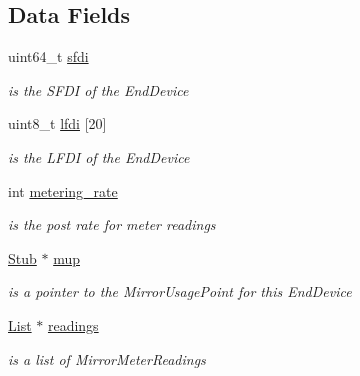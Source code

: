 \subsection*{Data Fields}
\begin{DoxyCompactItemize}
\item 
\mbox{\label{structDerDevice_a2a3131b81ae00c7ef1f48f67b5427db2}} 
uint64\+\_\+t \hyperlink{structDerDevice_a2a3131b81ae00c7ef1f48f67b5427db2}{sfdi}
\begin{DoxyCompactList}\small\item\em is the S\+F\+DI of the End\+Device \end{DoxyCompactList}\item 
\mbox{\label{structDerDevice_ad4c29cf0613088f60ab253e7a818efb5}} 
uint8\+\_\+t \hyperlink{structDerDevice_ad4c29cf0613088f60ab253e7a818efb5}{lfdi} \mbox{[}20\mbox{]}
\begin{DoxyCompactList}\small\item\em is the L\+F\+DI of the End\+Device \end{DoxyCompactList}\item 
\mbox{\label{structDerDevice_ac53ab83bf9d931ca49639603b655e2da}} 
int \hyperlink{structDerDevice_ac53ab83bf9d931ca49639603b655e2da}{metering\+\_\+rate}
\begin{DoxyCompactList}\small\item\em is the post rate for meter readings \end{DoxyCompactList}\item 
\mbox{\label{structDerDevice_a6c98d30c4bacd10b242fe9a12016653b}} 
\hyperlink{structStub}{Stub} $\ast$ \hyperlink{structDerDevice_a6c98d30c4bacd10b242fe9a12016653b}{mup}
\begin{DoxyCompactList}\small\item\em is a pointer to the Mirror\+Usage\+Point for this End\+Device \end{DoxyCompactList}\item 
\mbox{\label{structDerDevice_a55cdde70b78f453067820d05fd2cece9}} 
\hyperlink{structList}{List} $\ast$ \hyperlink{structDerDevice_a55cdde70b78f453067820d05fd2cece9}{readings}
\begin{DoxyCompactList}\small\item\em is a list of Mirror\+Meter\+Readings \end{DoxyCompactList}\item 

\end{DoxyCompactItemize}

